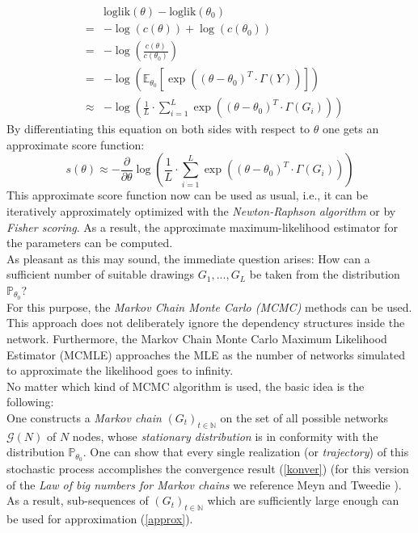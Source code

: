 \documentclass[10pt, conference, compsocconf]{IEEEtran}
\begin{document}
%
\begin{eqnarray*}
&&\text{loglik}(\theta)-\text{loglik}(\theta_0)\\&=&- \log(c(\theta))+\log(c(\theta_0))\\
                                             &=&- \log \left( \frac{c(\theta)}{c(\theta_0)} \right)\\
                                             &=&- \log \left( \mathbb{E}_{\theta_0}\left[ \exp\left((\theta - \theta_0)^T \cdot \Gamma(Y)\right) \right] \right)\\
                                             &\approx &- \log \left( \frac{1}{L} \cdot \sum_{i=1}^{L}  \exp \left((\theta - \theta_0)^T \cdot \Gamma(G_i) \right) \right)
\end{eqnarray*}
%
By differentiating this equation on both sides with respect to $\theta$ one gets an approximate score function:
%
\begin{equation}
s(\theta) \approx -\frac{\partial}{\partial \theta} \log \left( \frac{1}{L} \cdot \sum_{i=1}^{L}  \exp \left((\theta - \theta_0)^T \cdot \Gamma(G_i) \right) \right)
\label{score}
\end{equation}
%
This approximate score function now can be used as usual, i.e., it can be iteratively approximately optimized with the \textit{Newton-Raphson algorithm} or by \textit{Fisher scoring}. As a result, the approximate maximum-likelihood estimator for the parameters can be computed.\\[0.3cm]
As pleasant as this may sound, the immediate question arises: How can a sufficient number of suitable drawings $G_1,...,G_L$ be taken from the distribution $\mathbb{P}_{\theta_0}$? \\
For this purpose, the \textit{Markov Chain Monte Carlo (MCMC)} methods can be used. This approach does not deliberately ignore the dependency structures inside the network. Furthermore, the Markov Chain Monte Carlo Maximum Likelihood Estimator (MCMLE) approaches the MLE as the number of networks simulated to approximate the likelihood goes to infinity.\\[0.3cm]
No matter which kind of MCMC algorithm is used, the basic idea is the following:
\\One constructs a \textit{Markov chain} $(G_t)_{t \in \mathbb{N}}$ on the set of all possible networks $\mathcal{G}(N)$ of $N$ nodes, whose \textit{stationary distribution} is in conformity with the distribution $\mathbb{P}_{\theta_0}$. One can show that every single realization (or \textit{trajectory}) 
of this stochastic process accomplishes the convergence result (\ref{konver}) (for this version of the \textit{Law of big numbers for Markov chains} we reference Meyn and Tweedie \cite{Meyn.2009}). As a result, sub-sequences of $(G_t)_{t \in \mathbb{N}}$ which are sufficiently large enough can be used for approximation (\ref{approx}).\\[0.3cm]
\end{document}
